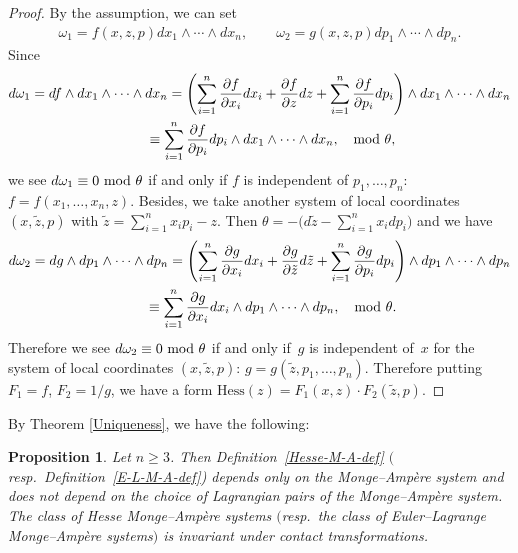 \documentclass[pdftex]{sigma}
\newtheorem{Prop}[Th]{Proposition}
\begin{document}
\begin{proof}
By the assumption, we can set
\begin{gather*}
\omega_1 = f(x,z,p)dx_1\wedge \cdots \wedge dx_n,
\qquad
\omega_2 =
g(x,z,p)dp_1\wedge \cdots \wedge dp_n.
\end{gather*}
Since
\begin{gather*}
d\omega_1   =df\wedge dx_1\wedge \cdots \wedge dx_n
=\left(\sum_{i=1}^n\frac{\partial f}{\partial x_i}dx_i+\frac{\partial f}{\partial z}dz+
\sum_{i=1}^n\frac{\partial f}{\partial p_i}dp_i\right)\wedge dx_1\wedge \cdots \wedge dx_n \\
\hphantom{d\omega_1}{} \equiv \sum_{i=1}^n\frac{\partial f}{\partial p_i} dp_i\wedge dx_1\wedge \cdots
\wedge dx_n,  \quad \rm{mod}\ \theta,
\end{gather*}
we see $d\omega_1 \equiv 0 \ \rm{mod}\ \theta$ if and only if
$f$ is independent of $p_1, \dots, p_n$:
$f=f(x_1, \dots, x_n,z)$.
Besides, we take another system of local coordinates $(x, \tilde{z}, p)$
with $\tilde{z} = \sum\limits_{i=1}^n x_ip_i - z$. Then
$\theta = - \Big(d\tilde{z} - \sum\limits_{i=1}^n x_idp_i\Big)$ and we have
\begin{gather*}
d\omega_2   =
dg\wedge dp_1\wedge \cdots \wedge dp_n
 =
\left(\sum_{i=1}^n\frac{\partial g}{\partial x_i}dx_i +\frac{\partial g}{\partial \tilde{z}}d\tilde{z}+
\sum_{i=1}^n\frac{\partial g}{\partial p_i}dp_i\right)
\wedge dp_1\wedge \cdots \wedge dp_n \\
\hphantom{d\omega_2}{}
 \equiv
\sum_{i=1}^n\frac{\partial g}{\partial x_i}
dx_i \wedge dp_1\wedge \cdots \wedge dp_n, \quad \rm{mod}\ \theta.
\end{gather*}
Therefore we see $d\omega_2 \equiv 0 \ \rm{mod}\ \theta$ if and only if~$g$ is independent of~$x$ for the system of local coordinates
$(x, \tilde{z}, p)$:
$g = g(\widetilde{z}, p_1, \dots, p_n)$.
Therefore putting $F_1 = f$, $F_2 = 1/g$,
we have a form
$\mathrm{Hess}(z) = F_1(x, z)\cdot F_2(\widetilde{z}, p)$.
\end{proof}


By Theorem \ref{Uniqueness}, we have the following:

\begin{Prop}
\label{contact invariance}
Let $n \geq 3$. Then Definition~{\rm \ref{Hesse-M-A-def}} $($resp.\ Definition~{\rm \ref{E-L-M-A-def})}
depends only on the Monge--Amp{\`e}re system and
does not depend on the choice of Lagrangian pairs of the Monge--Amp{\`e}re system.
The class of Hesse Monge--Amp{\`e}re systems $($resp.\
the class of Euler--Lagrange Monge--Amp{\`e}re systems$)$
is invariant under contact transformations.
\end{Prop}
\end{document}
